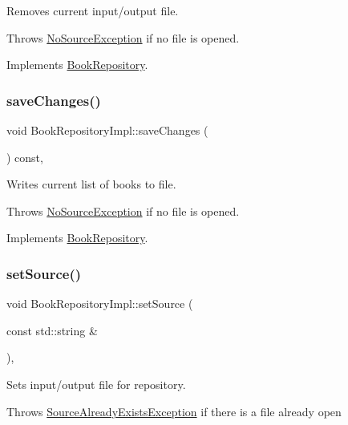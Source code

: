 Removes current input/output file.

Throws \hyperlink{structNoSourceException}{No\+Source\+Exception} if no file is opened. 

Implements \hyperlink{classBookRepository_ab1645ea5f97fd9d1ae5395b8234a3b7a}{Book\+Repository}.

\mbox{\label{classBookRepositoryImpl_a1c28f61a8981b52aa45ca1b11ef0e099}} 
\subsubsection{\texorpdfstring{save\+Changes()}{saveChanges()}}
{\footnotesize\ttfamily void Book\+Repository\+Impl\+::save\+Changes (\begin{DoxyParamCaption}{ }\end{DoxyParamCaption}) const\hspace{0.3cm}{\ttfamily [override]}, {\ttfamily [virtual]}}

Writes current list of books to file.

Throws \hyperlink{structNoSourceException}{No\+Source\+Exception} if no file is opened. 

Implements \hyperlink{classBookRepository_a943be98eae0c0d4b3b453284a39653c3}{Book\+Repository}.

\mbox{\label{classBookRepositoryImpl_aea4f6c50587d26ba6bf4bbfd41001dfd}} 
\subsubsection{\texorpdfstring{set\+Source()}{setSource()}}
{\footnotesize\ttfamily void Book\+Repository\+Impl\+::set\+Source (\begin{DoxyParamCaption}\item[{const std\+::string \&}]{ }\end{DoxyParamCaption})\hspace{0.3cm}{\ttfamily [override]}, {\ttfamily [virtual]}}

Sets input/output file for repository.

Throws \hyperlink{structSourceAlreadyExistsException}{Source\+Already\+Exists\+Exception} if there is a file already open 

